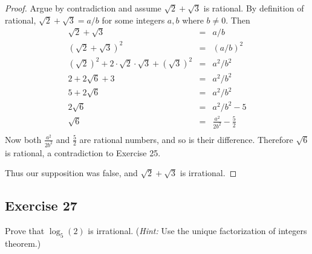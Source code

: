 \documentclass[14pt]{extarticle}
\begin{document}
\begin{proof}
Argue by contradiction and assume $\sqrt{2} + \sqrt{3}$ is rational. By definition of rational, $\sqrt{2} + \sqrt{3} = a/b$ for some integers $a,b$ where $b \neq 0$. Then
\[
\begin{array}{rcl}
\sqrt{2} + \sqrt{3} & = & a/b \\
(\sqrt{2} + \sqrt{3})^2 & = & (a/b)^2 \\
(\sqrt{2})^2 + 2\cdot\sqrt{2}\cdot\sqrt{3} + (\sqrt{3})^2 & = & a^2/b^2 \\
2 + 2\sqrt{6} + 3 & = & a^2/b^2 \\
5 + 2\sqrt{6} & = & a^2/b^2 \\
2\sqrt{6} & = & a^2/b^2 - 5\\
\sqrt{6} & = & \frac{a^2}{2b^2} - \frac{5}{2}\\
\end{array}
\]
Now both $\frac{a^2}{2b^2}$ and $\frac{5}{2}$ are rational numbers, and so is their difference. Therefore $\sqrt{6}$ is rational, a contradiction to Exercise 25.

Thus our supposition was false, and $\sqrt{2}+\sqrt{3}$ is irrational.
\end{proof}

\subsection{Exercise 27}
Prove that $\log_5(2)$ is irrational. ({\it Hint:} Use the unique factorization of integers theorem.)
\end{document}

